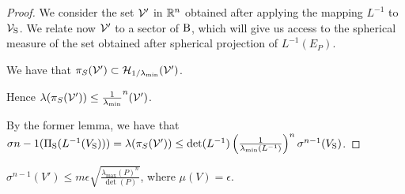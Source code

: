 \begin{proof}
We consider the set $\mathcal{V}'$ in $\mathbb{R}^n$ obtained after applying the mapping $L^{-1}$ to $\mathcal{V}_{\text{S}}$. We relate now $\mathcal{V}'$ to a sector of $\text{B}$, which will give us access to the spherical measure of the set obtained after spherical projection of $L^{-1}(E_P)$.

We have that $\pi_S(\mathcal{V}') \subset \mathcal{H}_{1/\lambda_{\min}} (\mathcal{V}') $.


Hence $\lambda(\pi_S(\mathcal{V}')) \leq \frac{1}{\lambda_{\min}}^n (\mathcal{V}')$.

By the former lemma, we have that $ \sigma{n-1}(\Pi_{\text{S}}(L^{-1}(V_{\text{S}}))) = \lambda(\pi_S(\mathcal{V}')) \leq \det(L^{-1}) \left(\frac{1}{\lambda_{\min}(L^{-1})}\right)^n \sigma^{n-1}(V_{\text{S}})$.





\end{proof}

\begin{theorem}$\sigma^{n-1}(V') \leq m\epsilon \sqrt{\frac{\lambda_{\max}(P)^n}{\det(P)}}$,
where $\mu(V) = \epsilon$.
\end{theorem}

